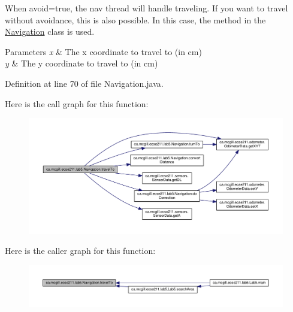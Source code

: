 When avoid=true, the nav thread will handle traveling. If you want to travel without avoidance, this is also possible. In this case, the method in the \hyperlink{classca_1_1mcgill_1_1ecse211_1_1lab5_1_1_navigation}{Navigation} class is used.


\begin{DoxyParams}{Parameters}
{\em x} & The x coordinate to travel to (in cm) \\
\hline
{\em y} & The y coordinate to travel to (in cm) \\
\hline
\end{DoxyParams}


Definition at line 70 of file Navigation.\+java.

Here is the call graph for this function\+:
\nopagebreak
\begin{figure}[H]
\begin{center}
\leavevmode
\includegraphics[width=350pt]{classca_1_1mcgill_1_1ecse211_1_1lab5_1_1_navigation_a318969f4776d0bf4a8721be3d2444a5c_cgraph}
\end{center}
\end{figure}
Here is the caller graph for this function\+:
\nopagebreak
\begin{figure}[H]
\begin{center}
\leavevmode
\includegraphics[width=350pt]{classca_1_1mcgill_1_1ecse211_1_1lab5_1_1_navigation_a318969f4776d0bf4a8721be3d2444a5c_icgraph}
\end{center}
\end{figure}
\mbox{\label{classca_1_1mcgill_1_1ecse211_1_1lab5_1_1_navigation_a2b39928c8062fe6863de8e818d009e91}} 
